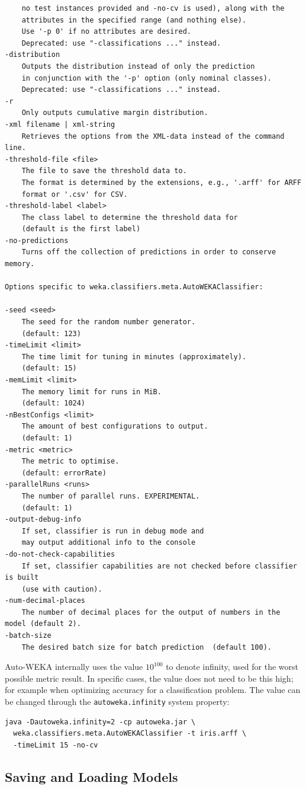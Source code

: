 \documentclass{article}
\begin{document}
\begin{verbatim}
	no test instances provided and -no-cv is used), along with the
	attributes in the specified range (and nothing else).
	Use '-p 0' if no attributes are desired.
	Deprecated: use "-classifications ..." instead.
-distribution
	Outputs the distribution instead of only the prediction
	in conjunction with the '-p' option (only nominal classes).
	Deprecated: use "-classifications ..." instead.
-r
	Only outputs cumulative margin distribution.
-xml filename | xml-string
	Retrieves the options from the XML-data instead of the command line.
-threshold-file <file>
	The file to save the threshold data to.
	The format is determined by the extensions, e.g., '.arff' for ARFF
	format or '.csv' for CSV.
-threshold-label <label>
	The class label to determine the threshold data for
	(default is the first label)
-no-predictions
	Turns off the collection of predictions in order to conserve memory.

Options specific to weka.classifiers.meta.AutoWEKAClassifier:

-seed <seed>
	The seed for the random number generator.
	(default: 123)
-timeLimit <limit>
	The time limit for tuning in minutes (approximately).
	(default: 15)
-memLimit <limit>
	The memory limit for runs in MiB.
	(default: 1024)
-nBestConfigs <limit>
	The amount of best configurations to output.
	(default: 1)
-metric <metric>
	The metric to optimise.
	(default: errorRate)
-parallelRuns <runs>
	The number of parallel runs. EXPERIMENTAL.
	(default: 1)
-output-debug-info
	If set, classifier is run in debug mode and
	may output additional info to the console
-do-not-check-capabilities
	If set, classifier capabilities are not checked before classifier is built
	(use with caution).
-num-decimal-places
	The number of decimal places for the output of numbers in the model (default 2).
-batch-size
	The desired batch size for batch prediction  (default 100).
\end{verbatim}

Auto-WEKA internally uses the value $10^{100}$ to denote infinity, used for the
worst possible metric result. In specific cases, the value does not need to be
this high; for example when optimizing accuracy for a classification problem.
The value can be changed through the \verb=autoweka.infinity= system property:
\begin{verbatim}
java -Dautoweka.infinity=2 -cp autoweka.jar \
  weka.classifiers.meta.AutoWEKAClassifier -t iris.arff \
  -timeLimit 15 -no-cv
\end{verbatim}


\subsection{Saving and Loading Models}
\end{document}
